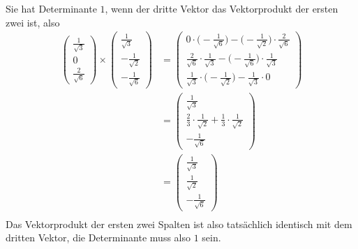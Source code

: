 \begin{loesung}
\begin{teilaufgaben}
Sie hat Determinante $1$, wenn der dritte Vektor das Vektorprodukt der
ersten zwei ist, also
\begin{align*}
\begin{pmatrix}
\frac1{\sqrt{3}}\\0\\\frac{2}{\sqrt{6}}
\end{pmatrix}\times\begin{pmatrix}
\frac1{\sqrt{3}}\\-\frac1{\sqrt{2}}\\-\frac1{\sqrt{6}}
\end{pmatrix}
&=
\begin{pmatrix}
0\cdot\bigl(-\frac1{\sqrt{6}}\bigr)-\bigl(-\frac1{\sqrt{2}}\bigr)\cdot\frac2{\sqrt{6}}\\
\frac2{\sqrt{6}}\cdot\frac1{\sqrt{3}}-\bigl(-\frac1{\sqrt{6}} \bigr)\cdot\frac1{\sqrt{3}}\\
\frac1{\sqrt{3}}\cdot\bigl(-\frac1{\sqrt{2}}\bigr)-\frac1{\sqrt{3}}\cdot 0
\end{pmatrix}
\\
&=\begin{pmatrix}
\frac1{\sqrt{3}}\\
\frac23\cdot\frac1{\sqrt{2}}+\frac13\cdot\frac1{\sqrt{2}}\\
-\frac1{\sqrt{6}}
\end{pmatrix}
\\
&=\begin{pmatrix}
\frac1{\sqrt{3}}\\
\frac1{\sqrt{2}}\\
-\frac1{\sqrt{6}}
\end{pmatrix}
\\
\end{align*}
Das Vektorprodukt der ersten zwei Spalten ist also tatsächlich
identisch mit dem dritten Vektor, die Determinante muss also $1$ sein.


\end{teilaufgaben}
\end{loesung}
